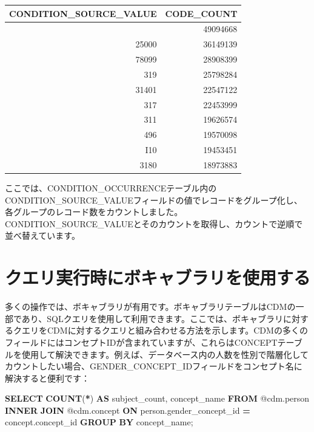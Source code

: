 \documentclass[
  11pt]{book}
\newenvironment{Shaded}{\begin{snugshade}}{\end{snugshade}}
\newcommand{\FunctionTok}[1]{\textcolor[rgb]{0.13,0.29,0.53}{\textbf{#1}}}
\newcommand{\KeywordTok}[1]{\textcolor[rgb]{0.13,0.29,0.53}{\textbf{#1}}}
\newcommand{\NormalTok}[1]{#1}
\newcommand{\OperatorTok}[1]{\textcolor[rgb]{0.81,0.36,0.00}{\textbf{#1}}}
\theoremstyle{definition}
\theoremstyle{definition}
\theoremstyle{definition}
\theoremstyle{definition}
\theoremstyle{remark}
\begin{document}
\begin{longtable}[]{@{}rr@{}}
\toprule\noalign{}
CONDITION\_SOURCE\_VALUE & CODE\_COUNT \\
\midrule\noalign{}
\endhead
\bottomrule\noalign{}
\endlastfoot
4019 & 49094668 \\
25000 & 36149139 \\
78099 & 28908399 \\
319 & 25798284 \\
31401 & 22547122 \\
317 & 22453999 \\
311 & 19626574 \\
496 & 19570098 \\
I10 & 19453451 \\
3180 & 18973883 \\
\end{longtable}

ここでは、CONDITION\_OCCURRENCEテーブル内のCONDITION\_SOURCE\_VALUEフィールドの値でレコードをグループ化し、各グループのレコード数をカウントしました。CONDITION\_SOURCE\_VALUEとそのカウントを取得し、カウントで逆順で並べ替えています。

\section{クエリ実行時にボキャブラリを使用する}\label{ux30afux30a8ux30eaux5b9fux884cux6642ux306bux30dcux30adux30e3ux30d6ux30e9ux30eaux3092ux4f7fux7528ux3059ux308b}

多くの操作では、ボキャブラリが有用です。ボキャブラリテーブルはCDMの一部であり、SQLクエリを使用して利用できます。ここでは、ボキャブラリに対するクエリをCDMに対するクエリと組み合わせる方法を示します。CDMの多くのフィールドにはコンセプトIDが含まれていますが、これらはCONCEPTテーブルを使用して解決できます。例えば、データベース内の人数を性別で階層化してカウントしたい場合、GENDER\_CONCEPT\_IDフィールドをコンセプト名に解決すると便利です：

\begin{Shaded}
\begin{Highlighting}[]
\KeywordTok{SELECT} \FunctionTok{COUNT}\NormalTok{(}\OperatorTok{*}\NormalTok{) }\KeywordTok{AS}\NormalTok{ subject\_count,}
\NormalTok{  concept\_name}
\KeywordTok{FROM}\NormalTok{ @cdm.person}
\KeywordTok{INNER} \KeywordTok{JOIN}\NormalTok{ @cdm.concept}
  \KeywordTok{ON}\NormalTok{ person.gender\_concept\_id }\OperatorTok{=}\NormalTok{ concept.concept\_id}
\KeywordTok{GROUP} \KeywordTok{BY}\NormalTok{ concept\_name;}
\end{Highlighting}
\end{Shaded}
\end{document}
